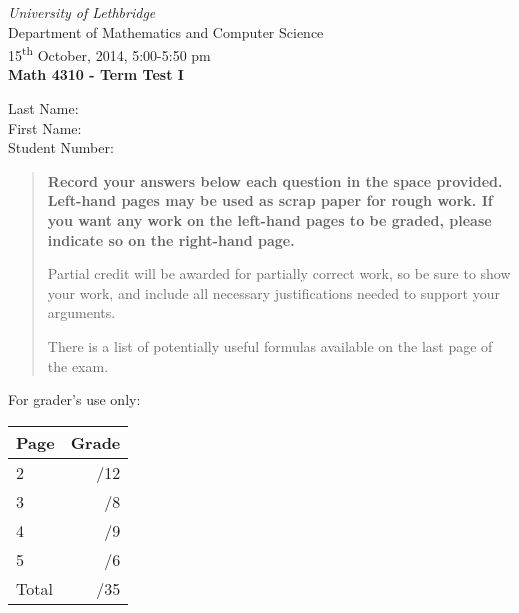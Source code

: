 \documentclass[12pt]{article}
\newcommand{\skipline}{\vspace{12pt}}
\begin{document}
\author{Instructor: Sean Fitzpatrick}
\thispagestyle{plain}
\begin{center}
\emph{University of Lethbridge}\\
Department of Mathematics and Computer Science\\
15\textsuperscript{th} October, 2014, 5:00-5:50 pm\\
{\bf Math 4310 - Term Test I}\\
\end{center}
\skipline \skipline \skipline \noindent \skipline
Last Name:\underline{\hspace{350pt}}\\
\skipline
First Name:\underline{\hspace{348pt}}\\
\skipline
Student Number:\underline{\hspace{322pt}}\\


\vspace{0.5in}


\begin{quote}
 {\bf Record your answers below each question in the space provided.    Left-hand pages may be used as scrap paper for rough work.  If you want any work on the left-hand pages to be graded, please indicate so on the right-hand page.
 
 \bigskip
 
Partial credit will be awarded for partially correct work, so be sure to show your work, and include all necessary justifications needed to support your arguments. 

There is a list of potentially useful formulas available on the last page of the exam.}
\end{quote}


\vspace{0.5in}

For grader's use only:

\begin{table}[hbt]
\begin{center}
\begin{tabular}{|l|r|} \hline
Page&Grade\\
\hline \hline
\cline{1-2} 2 & \enspace\enspace\enspace\enspace\enspace\enspace/12\\
\cline{1-2} 3 & \enspace\enspace\enspace\enspace\enspace\enspace/8\\
\cline{1-2} 4 & \enspace\enspace\enspace\enspace\enspace\enspace/9\\
\cline{1-2} 5 & \enspace\enspace\enspace\enspace\enspace\enspace/6\\
\cline{1-2} Total & \enspace\enspace\enspace\enspace\enspace\enspace/35\\
\hline
\end{tabular}

\skipline

\skipline

\skipline


\end{center}
\end{table}
\newpage
\end{document}
